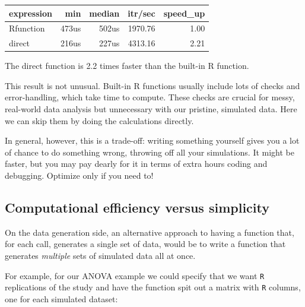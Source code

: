 \documentclass[
]{book}
\begin{document}
\begin{tabular}{l|r|r|r|r}
\hline
expression & min & median & itr/sec & speed\_up\\
\hline
Rfunction & 473us & 502us & 1970.76 & 1.00\\
\hline
direct & 216us & 227us & 4313.16 & 2.21\\
\hline
\end{tabular}

The direct function is 2.2 times faster than the built-in R function.

This result is not unusual.
Built-in R functions usually include lots of checks and error-handling, which take time to compute. These checks are crucial for messy, real-world data analysis but unnecessary with our pristine, simulated data.
Here we can skip them by doing the calculations directly.

In general, however, this is a trade-off: writing something yourself gives you a lot of chance to do something wrong, throwing off all your simulations.
It might be faster, but you may pay dearly for it in terms of extra hours coding and debugging.
Optimize only if you need to!

\subsection{Computational efficiency versus simplicity}\label{sec_comp_efficiency}

On the data generation side, an alternative approach to having a function that, for each call, generates a single set of data, would be to write a function that generates \emph{multiple} sets of simulated data all at once.

For example, for our ANOVA example we could specify that we want \texttt{R} replications of the study and have the function spit out a matrix with \texttt{R} columns, one for each simulated dataset:
\end{document}
